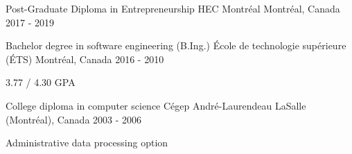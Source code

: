 
\begin{cventries}

  \cventry
    {Post-Graduate Diploma in Entrepreneurship} %
    {HEC Montréal} %
    {Montréal, Canada} %
    {2017 - 2019} %
    {}

  \cventry
    {Bachelor degree in software engineering (B.Ing.)} %
    {École de technologie supérieure (ÉTS)} %
    {Montréal, Canada} %
    {2016 - 2010} %
    {
      \begin{cvitems} %
        \item {3.77 / 4.30 GPA}
      \end{cvitems}
    }

  \cventry
    {College diploma in computer science} %
    {Cégep André-Laurendeau} %
    {LaSalle (Montréal), Canada} %
    {2003 - 2006} %
    {
      \begin{cvitems} %
        \item {Administrative data processing option}
      \end{cvitems}
    }

\end{cventries}